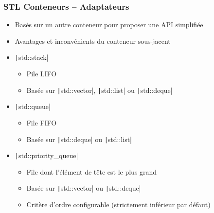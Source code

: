 \documentclass[C++.tex]{subfiles}
\begin{document}
\begin{frame}[fragile]
	\frametitle{STL Conteneurs -- Adaptateurs}
	\begin{itemize}
		\item Basés sur un autre conteneur pour proposer une API simplifiée
		\item Avantages et inconvénients du conteneur sous-jacent
		\item \texttt|std::stack|
		\begin{itemize}
			\item Pile LIFO
			\item Basée sur \texttt|std::vector|, \texttt|std::list| ou \texttt|std::deque|
		\end{itemize}
		\item \texttt|std::queue|
		\begin{itemize}
			\item File FIFO
			\item Basée sur \texttt|std::deque| ou \texttt|std::list|
		\end{itemize}
		\item \texttt|std::priority_queue|
		\begin{itemize}
			\item File dont l'élément de tête est le plus grand
			\item Basée sur \texttt|std::vector| ou \texttt|std::deque|
			\item Critère d'ordre configurable (strictement inférieur par défaut)
		\end{itemize}
	\end{itemize}
\end{frame}
\end{document}
